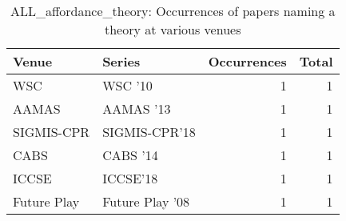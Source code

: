 \begin{table*}[t]
\begin{tabular}{llrr}
Venue & Series & Occurrences & Total\\\hline
\multirow{1}{*}{WSC } & WSC '10 & 1 & \multirow{1}{*}{1}\\
\multirow{1}{*}{AAMAS } & AAMAS '13 & 1 & \multirow{1}{*}{1}\\
\multirow{1}{*}{SIGMIS-CPR} & SIGMIS-CPR'18 & 1 & \multirow{1}{*}{1}\\
\multirow{1}{*}{CABS } & CABS '14 & 1 & \multirow{1}{*}{1}\\
\multirow{1}{*}{ICCSE} & ICCSE'18 & 1 & \multirow{1}{*}{1}\\
\multirow{1}{*}{Future Play } & Future Play '08 & 1 & \multirow{1}{*}{1}\\
\end{tabular}
\caption{ALL\_affordance\_theory: Occurrences of papers naming a theory at various venues}
\end{table*}
